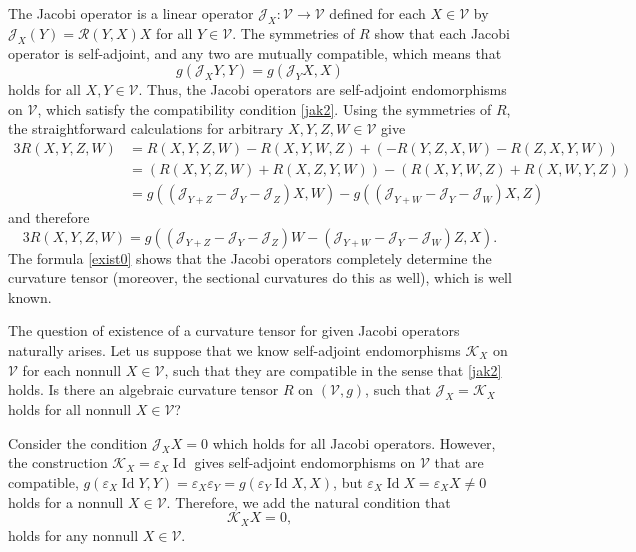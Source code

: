 \documentclass[preprint]{elsarticle}
\newcommand\mc{\mathcal}
\newcommand\ve{\varepsilon}%
\DeclareMathOperator{\id}{Id}
\begin{document}
The Jacobi operator is a linear operator $\mc{J}_X\colon\mc{V}\to\mc{V}$ 
defined for each $X\in\mc{V}$ by $\mc{J}_X(Y)=\mc{R}(Y,X)X$ for all $Y\in\mc{V}$.
The symmetries of $R$ show that each Jacobi operator is self-adjoint, and any two are mutually compatible, which means that 
\begin{equation}\label{jak2}
g(\mc{J}_XY,Y)=g(\mc{J}_YX,X)
\end{equation}
holds for all $X,Y\in\mc{V}$.
Thus, the Jacobi operators are self-adjoint endomorphisms on $\mc{V}$, which satisfy the compatibility condition \eqref{jak2}.
Using the symmetries of $R$, the straightforward calculations for arbitrary $X,Y,Z,W\in\mc{V}$ give
\begin{equation*}
\begin{aligned}
3R(X,Y,Z,W)&=R(X,Y,Z,W)-R(X,Y,W,Z)+(-R(Y,Z,X,W)-R(Z,X,Y,W))\\
&=(R(X,Y,Z,W)+R(X,Z,Y,W))-(R(X,Y,W,Z)+R(X,W,Y,Z))\\
&=g((\mc{J}_{Y+Z}-\mc{J}_{Y}-\mc{J}_{Z})X,W)-g((\mc{J}_{Y+W}-\mc{J}_{Y}-\mc{J}_{W})X,Z)%
\end{aligned}
\end{equation*} 
and therefore
\begin{equation}\label{exist0}
3R(X,Y,Z,W)=g((\mc{J}_{Y+Z}-\mc{J}_{Y}-\mc{J}_{Z})W-(\mc{J}_{Y+W}-\mc{J}_{Y}-\mc{J}_{W})Z,X).
\end{equation} 
The formula \eqref{exist0} shows that the Jacobi operators completely determine the curvature tensor
(moreover, the sectional curvatures do this as well), which is well known.

The question of existence of a curvature tensor for given Jacobi operators naturally arises. 
Let us suppose that we know self-adjoint endomorphisms $\mc{K}_X$ on $\mc{V}$ for each nonnull $X\in\mc{V}$,
such that they are compatible in the sense that \eqref{jak2} holds.
Is there an algebraic curvature tensor $R$ on $(\mc{V},g)$, such that $\mc{J}_X=\mc{K}_X$ holds for all nonnull $X\in\mc{V}$?

Consider the condition $\mc{J}_XX=0$ which holds for all Jacobi operators. 
However, the construction $\mc{K}_X=\ve_X\id$ gives self-adjoint endomorphisms on $\mc{V}$ that are compatible,
$g(\ve_X\id Y,Y)=\ve_X\ve_Y=g(\ve_Y\id X,X)$, but $\ve_X\id X=\ve_XX\neq 0$ holds for a nonnull $X\in\mc{V}$.
Therefore, we add the natural condition that 
\begin{equation}\label{exist1}
\mc{K}_XX=0,
\end{equation}
holds for any nonnull $X\in\mc{V}$. 
\end{document}
